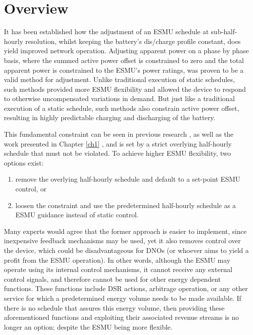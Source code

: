 \section{Overview}
\label{ch2:sec:overview}

It has been established how the adjustment of an ESMU schedule at sub-half-hourly resolution, whilst keeping the battery's dis/charge profile constant, does yield improved network operation.
Adjusting apparent power on a phase by phase basis, where the summed active power offset is constrained to zero and the total apparent power is constrained to the ESMU's power ratings, was proven to be a valid method for adjustment.
Unlike traditional execution of static schedules, such methods provided more ESMU flexibility and allowed the device to respond to otherwise uncompensated variations in demand.
But just like a traditional execution of a static schedule, such methods also constrain active power offset, resulting in highly predictable charging and discharging of the battery.

This fundamental constraint can be seen in previous research \cite{Rowe2014a, Yunusov2011}, as well as the work presented in Chapter \ref{ch1} \cite{Zangs2016}, and is set by a strict overlying half-hourly schedule that must not be violated.
To achieve higher ESMU flexibility, two options exist:

\begin{enumerate}
	\item remove the overlying half-hourly schedule and default to a set-point ESMU control, or
	\item loosen the constraint and use the predetermined half-hourly schedule as a ESMU guidance instead of static control.
\end{enumerate}

Many experts would agree that the former approach is easier to implement, since inexpensive feedback mechanisms may be used, yet it also removes control over the device, which could be disadvantageous for DNOs (or whoever aims to yield a profit from the ESMU operation).
In other words, although the ESMU may operate using its internal control mechanisms, it cannot receive any external control signals, and therefore cannot be used for other energy dependent functions.
These functions include DSR actions, arbitrage operation, or any other service for which a predetermined energy volume needs to be made available.
If there is no schedule that assures this energy volume, then providing these aforementioned functions and exploiting their associated revenue streams is no longer an option; despite the ESMU being more flexible.

